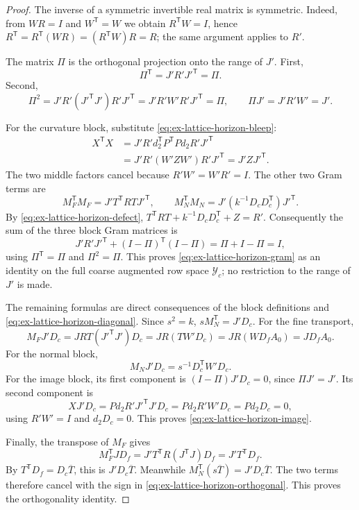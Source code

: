 \begin{proof}
The inverse of a symmetric invertible real matrix is symmetric. Indeed,
from $WR=I$ and $W^{\mathsf T}=W$ we obtain $R^{\mathsf T}W=I$, hence
$R^{\mathsf T}=R^{\mathsf T}(WR)=(R^{\mathsf T}W)R=R$; the same argument
applies to $R'$.

The matrix $\Pi$ is the orthogonal projection onto the range of $J'$.
First,
\[
 \Pi^{\mathsf T}=J'R'J'^{\mathsf T}=\Pi.
\]
Second,
\[
 \Pi^2=J'R'(J'^{\mathsf T}J')R'J'^{\mathsf T}
       =J'R'W'R'J'^{\mathsf T}=\Pi,
 \qquad \Pi J'=J'R'W'=J'.
\]

For the curvature block, substitute \eqref{eq:ex-lattice-horizon-bleep}:
\begin{align*}
 X^{\mathsf T}X
 &=J'R'd_2^{\mathsf T}P^{\mathsf T}P d_2R'J'^{\mathsf T}\\
 &=J'R'(W'ZW')R'J'^{\mathsf T}
  =J'ZJ'^{\mathsf T}.
\end{align*}
The two middle factors cancel because $R'W'=W'R'=I$. The other two
Gram terms are
\[
 M_F^{\mathsf T}M_F=J'T^{\mathsf T}RTJ'^{\mathsf T},
 \qquad
 M_N^{\mathsf T}M_N=J'(k^{-1}D_cD_c^{\mathsf T})J'^{\mathsf T}.
\]
By \eqref{eq:ex-lattice-horizon-defect},
$T^{\mathsf T}RT+k^{-1}D_cD_c^{\mathsf T}+Z=R'.$
Consequently the sum of the three block Gram matrices is
\[
 J'R'J'^{\mathsf T}+(I-\Pi)^{\mathsf T}(I-\Pi)
 =\Pi+I-\Pi=I,
\]
using $\Pi^{\mathsf T}=\Pi$ and $\Pi^2=\Pi$. This proves \eqref{eq:ex-lattice-horizon-gram} as an identity on the full
coarse augmented row space $\mathcal Y_c$; no restriction to the range of
$J'$ is made.

The remaining formulas are direct consequences of the block definitions
and \eqref{eq:ex-lattice-horizon-diagonal}. Since $s^2=k$,
$sM_N^{\mathsf T}=J'D_c$. For the fine transport,
\[
 M_FJ'D_c=JRT(J'^{\mathsf T}J')D_c
 =JR(TW'D_c)=JR(WD_fA_0)=JD_fA_0.
\]
For the normal block,
\[
 M_NJ'D_c=s^{-1}D_c^{\mathsf T}W'D_c.
\]
For the image block, its first component is
$(I-\Pi)J'D_c=0$, since $\Pi J'=J'.$ Its second component is
\[
 XJ'D_c=Pd_2R'J'^{\mathsf T}J'D_c
       =Pd_2R'W'D_c=Pd_2D_c=0,
\]
using $R'W'=I$ and $d_2D_c=0$. This proves
\eqref{eq:ex-lattice-horizon-image}.

Finally, the transpose of $M_F$ gives
\[
 M_F^{\mathsf T}JD_f
 =J'T^{\mathsf T}R(J^{\mathsf T}J)D_f
 =J'T^{\mathsf T}D_f.
\]
By $T^{\mathsf T}D_f=D_c\overline T$, this is
$J'D_c\overline T$. Meanwhile
$M_N^{\mathsf T}(s\overline T)=J'D_c\overline T$.
The two terms therefore cancel with the sign in
\eqref{eq:ex-lattice-horizon-orthogonal}. This proves the orthogonality
identity.
\end{proof}

